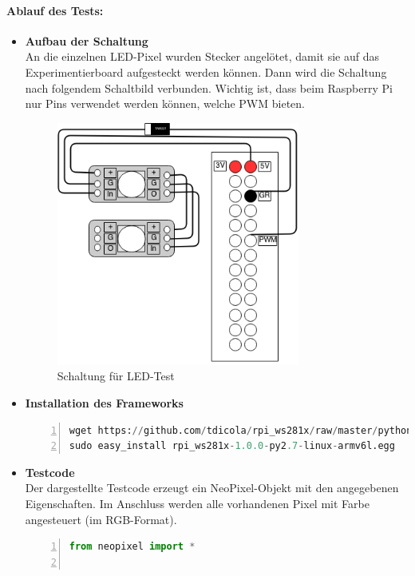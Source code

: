 \paragraph{Ablauf des Tests:}
\begin{itemize}

\item \textbf{Aufbau der Schaltung}\\
An die einzelnen LED-Pixel wurden Stecker angelötet, damit sie auf das Experimentierboard aufgesteckt werden können. Dann wird die Schaltung nach folgendem Schaltbild verbunden. Wichtig ist, dass beim Raspberry Pi nur Pins verwendet werden können, welche PWM bieten. \\
\begin{figure}[h]
\begin{minipage}{\textwidth}
            \centering
            \includegraphics[width=8cm]{./data/TestSchaltungLED.png}
            \caption{Schaltung für LED-Test}
        \end{minipage}
\end{figure}
\item \textbf{Installation des Frameworks} 
\begin{lstlisting}[caption = Installation Framework ws281x, language=Python, frame=single, breaklines=true,columns=fullflexible, commentstyle=\color{gray}\upshape, captionpos=b, numbers = left]
wget https://github.com/tdicola/rpi_ws281x/raw/master/python/dist/rpi_ws281x-1.0.0-py2.7-linux-armv6l.egg 
sudo easy_install rpi_ws281x-1.0.0-py2.7-linux-armv6l.egg
\end{lstlisting}
\item \textbf{Testcode} \\
Der dargestellte Testcode erzeugt ein NeoPixel-Objekt mit den angegebenen Eigenschaften. Im Anschluss werden alle vorhandenen Pixel mit Farbe angesteuert (im RGB-Format).
\begin{lstlisting}[caption = Testcode zur Ansteuerung der LEDs, language=python, frame=single, breaklines=true,columns=fullflexible, commentstyle=\color{gray}\upshape, captionpos=b, numbers = left]
from neopixel import * 
	

\end{lstlisting}
\end{itemize}
